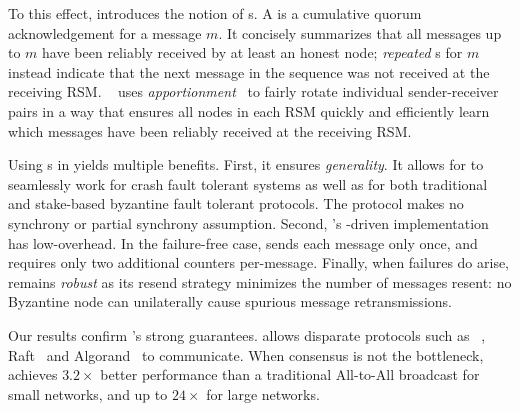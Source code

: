  To this effect, \Scrooge{} introduces the notion of \quack{}s. A \quack{} is a cumulative quorum acknowledgement for a message $m$. It concisely summarizes that all messages up to $m$ have been reliably received by at least an honest node;
\textit{repeated} \quack{}s for $m$ instead indicate that the next message in the sequence was not received at the receiving RSM. \
\Scrooge{} uses \textit{apportionment}~\cite{apportionment} to fairly rotate individual sender-receiver pairs in a way that ensures all nodes in each RSM quickly and efficiently learn which messages have been reliably received at the receiving RSM.

Using \quack{}s in \Scrooge{} yields multiple benefits. First, it ensures \textit{generality}. It allows for \Scrooge{} to seamlessly work for crash fault tolerant systems as well as for both traditional and stake-based byzantine fault tolerant protocols. The protocol makes no synchrony or partial synchrony assumption. Second, \Scrooge{}'s \quack{}-driven implementation has low-overhead. In the failure-free case, \Scrooge{} sends each message only once, and requires only two additional counters per-message. Finally, when failures do arise, \Scrooge{} remains \textit{robust} as its resend strategy minimizes the number of messages resent: no Byzantine node can unilaterally cause spurious message retransmissions.


%
Our results confirm \Scrooge{}'s strong guarantees. 
\Scrooge{} allows disparate protocols such as \pbft~\cite{pbftj}, Raft~\cite{raft} and Algorand~\cite{algorand} to communicate. When consensus is not the bottleneck, \Scrooge{} achieves $3.2\times$ better performance than a traditional All-to-All broadcast for small networks, and up to $24\times$ for large networks.

